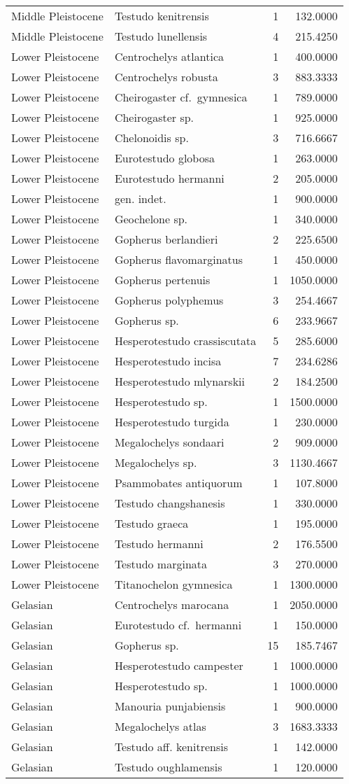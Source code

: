 \begin{longtable}[]{@{}llrr@{}}
	Middle Pleistocene & Testudo kenitrensis & 1 & 132.0000\tabularnewline
	Middle Pleistocene & Testudo lunellensis & 4 & 215.4250\tabularnewline
	Lower Pleistocene & Centrochelys atlantica & 1 & 400.0000\tabularnewline
	Lower Pleistocene & Centrochelys robusta & 3 & 883.3333\tabularnewline
	Lower Pleistocene & Cheirogaster cf.~gymnesica & 1 &
	789.0000\tabularnewline
	Lower Pleistocene & Cheirogaster sp. & 1 & 925.0000\tabularnewline
	Lower Pleistocene & Chelonoidis sp. & 3 & 716.6667\tabularnewline
	Lower Pleistocene & Eurotestudo globosa & 1 & 263.0000\tabularnewline
	Lower Pleistocene & Eurotestudo hermanni & 2 & 205.0000\tabularnewline
	Lower Pleistocene & gen. indet. & 1 & 900.0000\tabularnewline
	Lower Pleistocene & Geochelone sp. & 1 & 340.0000\tabularnewline
	Lower Pleistocene & Gopherus berlandieri & 2 & 225.6500\tabularnewline
	Lower Pleistocene & Gopherus flavomarginatus & 1 &
	450.0000\tabularnewline
	Lower Pleistocene & Gopherus pertenuis & 1 & 1050.0000\tabularnewline
	Lower Pleistocene & Gopherus polyphemus & 3 & 254.4667\tabularnewline
	Lower Pleistocene & Gopherus sp. & 6 & 233.9667\tabularnewline
	Lower Pleistocene & Hesperotestudo crassiscutata & 5 &
	285.6000\tabularnewline
	Lower Pleistocene & Hesperotestudo incisa & 7 & 234.6286\tabularnewline
	Lower Pleistocene & Hesperotestudo mlynarskii & 2 &
	184.2500\tabularnewline
	Lower Pleistocene & Hesperotestudo sp. & 1 & 1500.0000\tabularnewline
	Lower Pleistocene & Hesperotestudo turgida & 1 & 230.0000\tabularnewline
	Lower Pleistocene & Megalochelys sondaari & 2 & 909.0000\tabularnewline
	Lower Pleistocene & Megalochelys sp. & 3 & 1130.4667\tabularnewline
	Lower Pleistocene & Psammobates antiquorum & 1 & 107.8000\tabularnewline
	Lower Pleistocene & Testudo changshanesis & 1 & 330.0000\tabularnewline
	Lower Pleistocene & Testudo graeca & 1 & 195.0000\tabularnewline
	Lower Pleistocene & Testudo hermanni & 2 & 176.5500\tabularnewline
	Lower Pleistocene & Testudo marginata & 3 & 270.0000\tabularnewline
	Lower Pleistocene & Titanochelon gymnesica & 1 &
	1300.0000\tabularnewline
	Gelasian & Centrochelys marocana & 1 & 2050.0000\tabularnewline
	Gelasian & Eurotestudo cf.~hermanni & 1 & 150.0000\tabularnewline
	Gelasian & Gopherus sp. & 15 & 185.7467\tabularnewline
	Gelasian & Hesperotestudo campester & 1 & 1000.0000\tabularnewline
	Gelasian & Hesperotestudo sp. & 1 & 1000.0000\tabularnewline
	Gelasian & Manouria punjabiensis & 1 & 900.0000\tabularnewline
	Gelasian & Megalochelys atlas & 3 & 1683.3333\tabularnewline
	Gelasian & Testudo aff. kenitrensis & 1 & 142.0000\tabularnewline
	Gelasian & Testudo oughlamensis & 1 & 120.0000\tabularnewline

\end{longtable}
